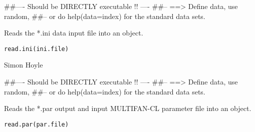 \documentclass[a4paper]{book}
\begin{document}
%
\begin{Examples}
\begin{ExampleCode}
##---- Should be DIRECTLY executable !! ----
##-- ==>  Define data, use random,
##--	or do  help(data=index)  for the standard data sets.

\end{ExampleCode}
\end{Examples}
%
\begin{Description}\relax

Reads the *.ini data input file into an object. 
\end{Description}
%
\begin{Usage}
\begin{verbatim}
read.ini(ini.file)
\end{verbatim}
\end{Usage}
%
\begin{Arguments}
\begin{ldescription}
\item[\code{ini.file}] 


\end{ldescription}
\end{Arguments}
%
\begin{Author}\relax

Simon Hoyle
\end{Author}
%
\begin{Examples}
\begin{ExampleCode}
##---- Should be DIRECTLY executable !! ----
##-- ==>  Define data, use random,
##--	or do  help(data=index)  for the standard data sets.

\end{ExampleCode}
\end{Examples}
%
\begin{Description}\relax

Reads the *.par output and input MULTIFAN-CL parameter file into an object. 
\end{Description}
%
\begin{Usage}
\begin{verbatim}
read.par(par.file)
\end{verbatim}
\end{Usage}
\end{document}
